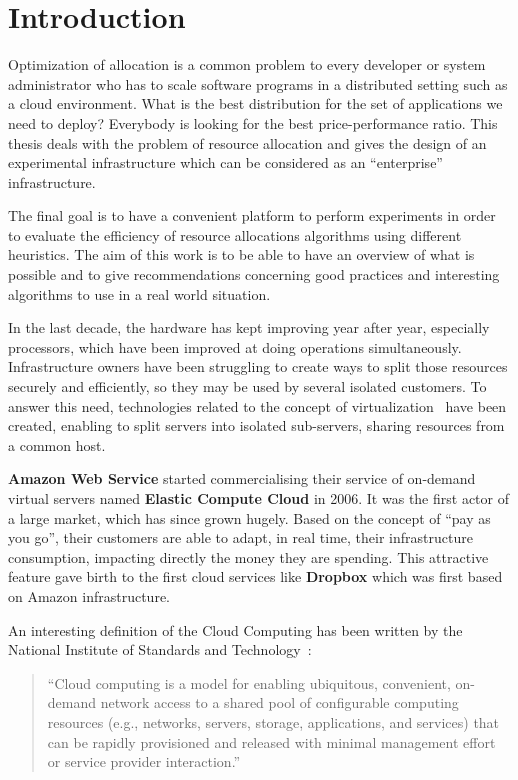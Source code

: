 \chapter*{Introduction}

Optimization of allocation is a common problem to every developer or system
administrator who has to scale software programs in a distributed setting such
as a cloud environment. What is the best distribution for the set of
applications we need to deploy? Everybody is looking for the best
price-performance ratio. This thesis deals with the problem of resource
allocation and gives the design of an experimental infrastructure which can be
considered as an ``enterprise'' infrastructure.

The final goal is to have a convenient platform to perform experiments in order
to evaluate the efficiency of resource allocations algorithms using different
heuristics. The aim of this work is to be able to have an overview of what is
possible and to give recommendations concerning good practices and interesting
algorithms to use in a real world situation.

In the last decade, the hardware has kept improving year
after year, especially processors, which have been improved at doing operations
simultaneously. Infrastructure owners have been struggling to create ways to
split those resources securely and efficiently, so they may be used by several
isolated customers. To answer this need, technologies related to the concept of
virtualization~\cite{virtualisation} have been created, enabling to split
servers into isolated sub-servers, sharing resources from a common host.

\textbf{Amazon Web Service} started commercialising their service of
on-demand virtual servers named \textbf{Elastic Compute Cloud} in 2006. It was
the first actor of a large market, which has since grown hugely. Based on the
concept of ``pay as you go'', their customers are able to adapt, in real
time, their infrastructure consumption, impacting directly the money they are
spending. This attractive feature gave birth to the first cloud services like
\textbf{Dropbox} which was first based on Amazon infrastructure.

An interesting definition of the Cloud Computing has been written by the
National Institute of Standards and Technology~\citep*{nistcloudcomputing}:
\begin{quote}
	“Cloud computing is a model for enabling ubiquitous, convenient, on-demand
	network access to a shared pool of configurable computing resources (e.g.,
	networks, servers, storage, applications, and services) that can be rapidly
	provisioned and released with minimal management effort or service provider
	interaction.”
\end{quote}

